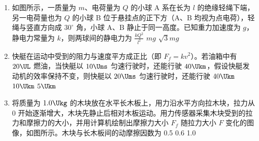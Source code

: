\documentclass[\gkver]{gaokaozhenti}
\begin{document}
\begin{enumerate}
\item
如图所示，一质量为 $m$、电荷量为 $Q$ 的小球 A 系在长为 $l$ 的绝缘轻绳下端，另一电荷量也为 $Q$ 的小球 B 位于悬挂点的正下方（A、B 均视为点电荷），轻绳与竖直方向成 $30^{\circ}$ 角，小球 A、B 静止于同一高度。已知重力加速度为 $g$，静电力常量为 $k$，则两球间的静电力为
{$\frac{kQ^{2}}{l^{2}}$}
{$mg$}
{$\sqrt{3}mg$}

\item
快艇在运动中受到的阻力与速度平方成正比（即 $F_{f}=kv^{2}$）。若油箱中有 $20\UL$ 燃油，当快艇以 $10\Ums$ 匀速行驶时，还能行驶 $40\Ukm$，假设快艇发动机的效率保持不变，则快艇以 $20\Ums$ 匀速行驶时，还能行驶
\fourchoices[answer=C]
{$80\Ukm$}
{$40\Ukm$}
{$10\Ukm$}
{$5\Ukm$}

\item
将质量为 $1.0\Ukg$ 的木块放在水平长木板上，用力沿水平方向拉木块，拉力从 0 开始逐渐增大，木块先静止后相对木板运动。用力传感器采集木块受到的拉力和摩擦力的大小，并用计算机绘制出摩擦力大小 $F_{f}$ 随拉力大小 $F$ 变化的图像，如图所示。木块与长木板间的动摩擦因数为
{0.5}
{0.6}
{1.0}


\end{enumerate}
\end{document}
